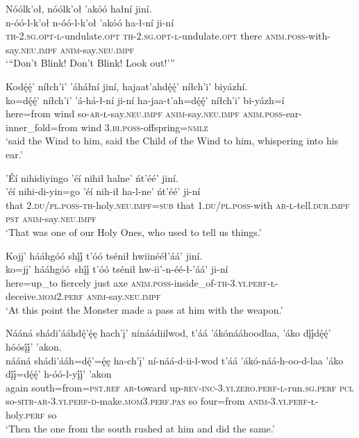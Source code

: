 \ea\label{ex:text4-4-9}
Nóólk’oł, nóólk’oł ’akóó hałní jiní.\\
\gll n-óó-l-k’oł	n-óó-l-k’oł	’akóó	ha-ł-ní	ji-ní\\
     \textsc{th}-2.\textsc{sg}.\textsc{opt}-\textsc{l}-undulate.\textsc{opt}	\textsc{th}-2.\textsc{sg}.\textsc{opt}-\textsc{l}-undulate.\textsc{opt}	there	\textsc{anim}.\textsc{poss}-with-say.\textsc{neu}.\textsc{impf}	\textsc{anim}-say.\textsc{neu}.\textsc{impf}\\
\glt `{``}Don't Blink! Don't Blink! Look out!'''
\z

\ea\label{ex:text4-4-10}
Kodę́ę́’ níłch’i’ ’áháłní jiní, hajaat’ahdę́ę́’ níłch’i’ biyázhí.\\
\gll ko=dę́ę́’	níłch’i’	’á-há-ł-ní	ji-ní	ha-jaa-t’ah=dę́ę́’	níłch’i’	bi-yázh=í\\
     here=from	wind	so-\textsc{ar}-\textsc{ł}-say.\textsc{neu}.\textsc{impf}	\textsc{anim}-say.\textsc{neu}.\textsc{impf}	\textsc{anim}.\textsc{poss}-ear-inner\_fold=from	wind	3.\textsc{bi}.\textsc{poss}-offspring=\textsc{nmlz}\\
\glt `said the Wind to him, said the Child of the Wind to him, whispering into his ear.'
\z

\ea\label{ex:text4-4-11}
’Éí nihidiyingo ’éí nihił halne’ ńt’éé’ jiní.\\
\gll ’éí	nihi-di-yin=go	’éí	nih-ił	ha-l-ne’	ńt’éé’	ji-ní\\
     that	2.\textsc{du}/\textsc{pl}.\textsc{poss}-\textsc{th}-holy.\textsc{neu}.\textsc{impf}=\textsc{sub}	that	1.\textsc{du}/\textsc{pl}.\textsc{poss}-with	\textsc{ar}-\textsc{l}-tell.\textsc{dur}.\textsc{impf}	\textsc{pst}	\textsc{anim}-say.\textsc{neu}.\textsc{impf}\\
\glt `That was one of our Holy Ones, who used to tell us things.'
\z

\ea\label{ex:text4-4-12}
Kojį’ hááhgóó shį́į́ t’óó tsénił hwiinééł’áá’ jiní.\\
\gll ko=jį’	hááhgóó~{shį́į́}	t’óó	tsénił	hw-ii’-n-éé-ł-’áá’	ji-ní\\
     here=up\_to	fiercely	just	axe	\textsc{anim}.\textsc{poss}-inside\_of-\textsc{th}-3.\textsc{yi}.\textsc{perf}-\textsc{ł}-deceive.\textsc{mom}2.\textsc{perf}	\textsc{anim}-say.\textsc{neu}.\textsc{impf}\\
\glt `At this point the Monster made a pass at him with the weapon.'
\z

\ea\label{ex:text4-4-13}
Nááná shádi’ááhdę́’ę́ę hach’į’ nínáádiilwod, t’áá ’ákónááhoodlaa, ’áko dį́į́dę́ę́’ hóósį́į́’ ’akon.\\
\gll nááná	shádi’ááh=dę́’=ę́ę	ha-ch’į’	ní-náá-d-ii-l-wod	t’áá	’ákó-náá-h-oo-d-laa	’áko	dį́į́=dę́ę́’	h-óó-ł-yį́į́’	’akon\\
     again	south=from=\textsc{pst}.\textsc{ref}	\textsc{ar}-toward	up-\textsc{rev}-\textsc{inc}-3.\textsc{yi}.\textsc{zero}.\textsc{perf}-\textsc{l}-run.\textsc{sg}.\textsc{perf}	\textsc{pcl}	so-\textsc{sitr}-\textsc{ar}-3.\textsc{yi}.\textsc{perf}-\textsc{d}-make.\textsc{mom}3.\textsc{perf}.\textsc{pas}	so	four=from	\textsc{anim}-3.\textsc{yi}.\textsc{perf}-\textsc{ł}-holy.\textsc{perf}	so\\
\glt `Then the one from the south rushed at him and did the same.'
\z

